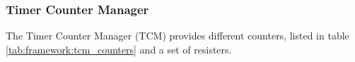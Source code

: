 %

%
%
\subsubsection{Timer Counter Manager}\label{sec:framework:tcm}

The Timer Counter Manager (TCM) provides different counters, listed in table \ref{tab:framework:tcm_counters} and a set of resisters.

